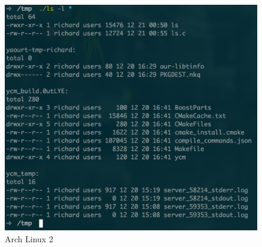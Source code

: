 \documentclass[a4paper, adobefonts]{ctexart}
\begin{document}
\begin{figure}[htp!]
    \centering
    \includegraphics[scale=0.6]{4.png}
    \caption{Arch Linux 2}
    \label{fig:4}
\end{figure}
\end{document}

